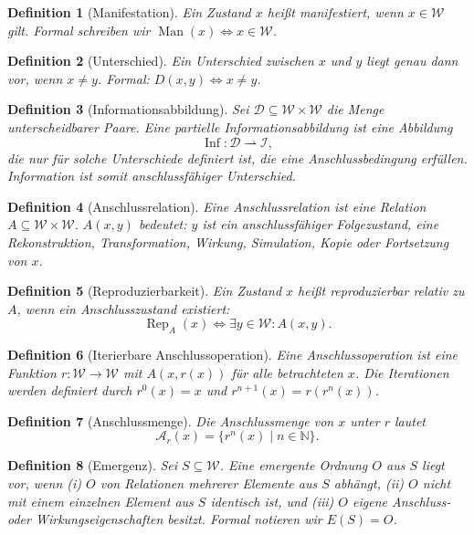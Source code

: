 \documentclass[11pt,a4paper]{article}
\newtheorem{definition}{Definition}[section]
\theoremstyle{remark}
\newcommand{\W}{\mathcal{W}}
\newcommand{\I}{\mathcal{I}}
\newcommand{\D}{\mathcal{D}}
\newcommand{\A}{\mathcal{A}}
\newcommand{\Inf}{\operatorname{Inf}}
\newcommand{\Man}{\operatorname{Man}}
\newcommand{\Rep}{\operatorname{Rep}}
\begin{document}
\begin{definition}[Manifestation]
Ein Zustand $x$ heißt manifestiert, wenn $x\in\W$ gilt. Formal schreiben wir $\Man(x) \Leftrightarrow x\in\W$.
\end{definition}

\begin{definition}[Unterschied]
Ein Unterschied zwischen $x$ und $y$ liegt genau dann vor, wenn $x\neq y$. Formal: $D(x,y)\Leftrightarrow x\neq y$.
\end{definition}

\begin{definition}[Informationsabbildung]
Sei $\D\subseteq \W\times\W$ die Menge unterscheidbarer Paare. Eine partielle Informationsabbildung ist eine Abbildung
\[
\Inf:\D \rightharpoonup \I,
\]
die nur für solche Unterschiede definiert ist, die eine Anschlussbedingung erfüllen. Information ist somit anschlussfähiger Unterschied.
\end{definition}

\begin{definition}[Anschlussrelation]
Eine Anschlussrelation ist eine Relation $A\subseteq\W\times\W$. $A(x,y)$ bedeutet: $y$ ist ein anschlussfähiger Folgezustand, eine Rekonstruktion, Transformation, Wirkung, Simulation, Kopie oder Fortsetzung von $x$.
\end{definition}

\begin{definition}[Reproduzierbarkeit]
Ein Zustand $x$ heißt reproduzierbar relativ zu $A$, wenn ein Anschlusszustand existiert:
\[
\Rep_A(x) \Leftrightarrow \exists y\in\W: A(x,y).
\]
\end{definition}

\begin{definition}[Iterierbare Anschlussoperation]
Eine Anschlussoperation ist eine Funktion $r:\W\to\W$ mit $A(x,r(x))$ für alle betrachteten $x$. Die Iterationen werden definiert durch $r^0(x)=x$ und $r^{n+1}(x)=r(r^n(x))$.
\end{definition}

\begin{definition}[Anschlussmenge]
Die Anschlussmenge von $x$ unter $r$ lautet
\[
\A_r(x)=\{r^n(x)\mid n\in\mathbb{N}\}.
\]
\end{definition}

\begin{definition}[Emergenz]
Sei $S\subseteq\W$. Eine emergente Ordnung $O$ aus $S$ liegt vor, wenn (i) $O$ von Relationen mehrerer Elemente aus $S$ abhängt, (ii) $O$ nicht mit einem einzelnen Element aus $S$ identisch ist, und (iii) $O$ eigene Anschluss- oder Wirkungseigenschaften besitzt. Formal notieren wir $E(S)=O$.
\end{definition}
\end{document}
